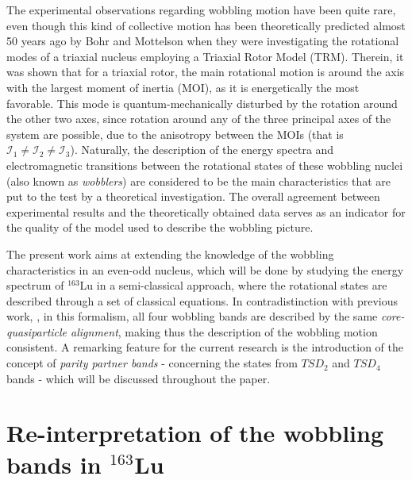 \documentclass[myclassdoc,debug]{rjparticle}
\begin{document}
The experimental observations regarding wobbling motion have been quite rare, even though this kind of collective motion has been theoretically predicted almost 50 years ago by Bohr and Mottelson \cite{bohr1998nuclear} when they were investigating the rotational modes of a triaxial nucleus employing a Triaxial Rotor Model (TRM). Therein, it was shown that for a triaxial rotor, the main rotational motion is around the axis with the largest moment of inertia (MOI), as it is energetically the most favorable. This mode is quantum-mechanically disturbed by the rotation around the other two axes, since rotation around any of the three principal axes of the system are possible, due to the anisotropy between the MOIs (that is $\mathcal{I}_1\neq\mathcal{I}_2\neq\mathcal{I}_3$). Naturally, the description of the energy spectra and electromagnetic transitions between the rotational states of these wobbling nuclei (also known as \emph{wobblers}) are considered to be the main characteristics that are put to the test by a theoretical investigation. The overall agreement between experimental results and the theoretically obtained data serves as an indicator for the quality of the model used to describe the wobbling picture.

The present work aims at extending the knowledge of the wobbling characteristics in an even-odd nucleus, which will be done by studying the energy spectrum of $^{163}$Lu in a semi-classical approach, where the rotational states are described through a set of classical equations. In contradistinction with previous work, \cite{raduta2020towards}, in this formalism, all four wobbling bands are described by the same \emph{core-quasiparticle alignment}, making thus the description of the wobbling motion consistent. A remarking feature for the current research is the introduction of the concept of \emph{parity partner bands} - concerning the states from $TSD_2$ and $TSD_4$ bands -  which will be discussed throughout the paper.

\section{\texorpdfstring{Re-interpretation of the wobbling bands in $^{163}$Lu}%
                               {Re-interpretation of the wobbling bands structure for 163Lu}}
\label{section-reinterpretation}
\end{document}
